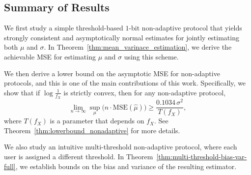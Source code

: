 \documentclass[10pt]{article} %
\theoremstyle{plain}
\theoremstyle{definition}
\theoremstyle{remark}
\begin{document}
\subsection{Summary of Results}
We first study a simple threshold-based $1$-bit non-adaptive protocol that yields strongly consistent and asymptotically normal estimates for jointly estimating both $\mu$ and $\sigma$. 
In Theorem~\ref{thm:mean_varinace_estimation}, we derive the achievable MSE for estimating $\mu$ and $\sigma$ using this scheme. 


We then derive a lower bound on the asymptotic MSE for non-adaptive protocols, and this is one of the main contributions of this work. Specifically, we show that  if $\log\frac{1}{f_X}$ is strictly convex, then for any non-adaptive protocol, 
\begin{equation}\label{eq:mse_lb_nonadaptive_case}
\lim_{n\to\infty} \sup_{\mu}  \Big(n \cdot \mathrm{MSE}(\hat{\mu}) \Big)\geq \frac{0.1034 \,\sigma^2}{T(f_X)}, 
\end{equation}
where $T(f_X)$ is a parameter that depends on $f_X$. See Theorem~\ref{thm:lowerbound_nonadaptive} for more details.


\par We also study an intuitive multi-threshold non-adaptive protocol, where each user is assigned a different threshold. In Theorem~\ref{thm:multi-threshold-bias-var-full}, we establish bounds on the bias and variance of the resulting estimator. 
\end{document}
